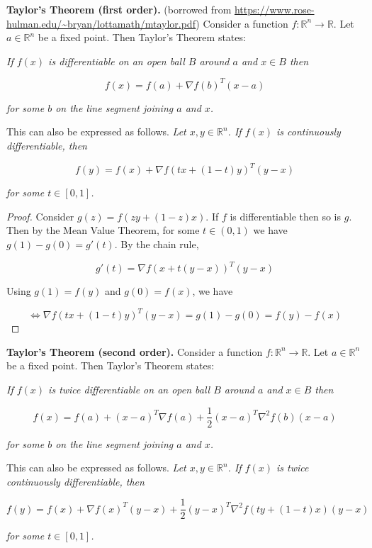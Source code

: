 \textbf{Taylor's Theorem (first order).} (borrowed from \url{https://www.rose-hulman.edu/~bryan/lottamath/mtaylor.pdf}) Consider a function \(f: \mathbb{R}^n \to \mathbb{R}\). Let \(a \in \mathbb{R}^n\) be a fixed point. Then Taylor's Theorem states:

\textit{If \(f(x)\) is differentiable on an open ball \(B\) around \(a\) and \(x \in B\) then}

\[
f(x) = f(a) + \nabla f(b)^T(x - a)
\]

\textit{for some \(b\) on the line segment joining \(a\) and \(x\).} 

This can also be expressed as follows. \textit{Let \(x, y \in \mathbb{R}^n\). If \(f(x)\) is continuously differentiable, then}

\[
f(y) = f(x) + \nabla f(tx + (1-t)y)^T  (y - x)
\]

\textit{for some \(t \in [0, 1]\).} 

\begin{proof}
Consider \(g(z) = f(zy + (1-z)x)\). If \(f\) is differentiable then so is \(g\). Then by the Mean Value Theorem, for some \(t \in (0, 1)\) we have \(g(1) - g(0) = g'(t)\). By the chain rule,

\[
g'(t) = \nabla f(x + t(y - x))^T (y - x)
\]

Using \(g(1) = f(y)\) and \(g(0) = f(x)\), we have

\[
\iff  \nabla f(tx + (1-t)y)^T (y - x) = g(1) - g(0) = f(y) - f(x)
\]
\end{proof}

\textbf{Taylor's Theorem (second order).} Consider a function \(f: \mathbb{R}^n \to \mathbb{R}\). Let \(a \in \mathbb{R}^n\) be a fixed point. Then Taylor's Theorem states:

\textit{If \(f(x)\) is twice differentiable on an open ball \(B\) around \(a\) and \(x \in B\) then}

\[
f(x) = f(a) + (x -a)^T \nabla f(a) + \frac{1}{2}(x-a)^T \nabla^2 f(b) (x-a)
\]

\textit{for some \(b\) on the line segment joining \(a\) and \(x\).} 

This can also be expressed as follows. \textit{Let \(x, y \in \mathbb{R}^n\). If \(f(x)\) is twice continuously differentiable, then}

\[
f(y) = f(x) +  \nabla f(x)^T (y -x) + \frac{1}{2}(y - x)^T \nabla^2 f(ty + (1-t)x) (y - x)
\]

\textit{for some \(t \in [0, 1]\).} 

